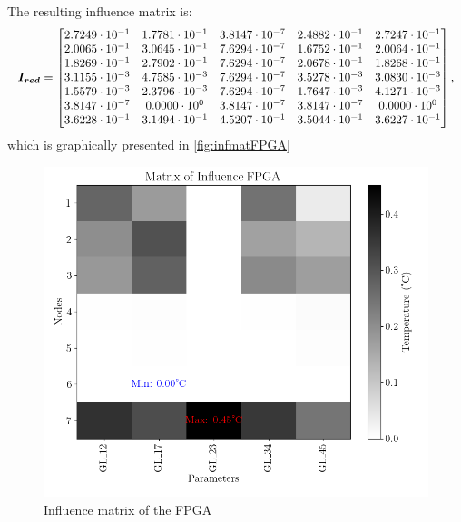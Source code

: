 The resulting influence matrix is:
\begin{equation}
    \resizebox{\textwidth}{!}{$\displaystyle
    \boldsymbol{I_{red}} = \begin{bmatrix}
        2.7249 \cdot 10^{-1} & 1.7781 \cdot 10^{-1} & 3.8147 \cdot 10^{-7} & 2.4882 \cdot 10^{-1} & 2.7247 \cdot 10^{-1} \\
        2.0065 \cdot 10^{-1} & 3.0645 \cdot 10^{-1} & 7.6294 \cdot 10^{-7} & 1.6752 \cdot 10^{-1} & 2.0064 \cdot 10^{-1} \\
        1.8269 \cdot 10^{-1} & 2.7902 \cdot 10^{-1} & 7.6294 \cdot 10^{-7} & 2.0678 \cdot 10^{-1} & 1.8268 \cdot 10^{-1} \\
        3.1155 \cdot 10^{-3} & 4.7585 \cdot 10^{-3} & 7.6294 \cdot 10^{-7} & 3.5278 \cdot 10^{-3} & 3.0830 \cdot 10^{-3} \\
        1.5579 \cdot 10^{-3} & 2.3796 \cdot 10^{-3} & 7.6294 \cdot 10^{-7} & 1.7647 \cdot 10^{-3} & 4.1271 \cdot 10^{-3} \\
        3.8147 \cdot 10^{-7} & 0.0000 \cdot 10^{0} & 3.8147 \cdot 10^{-7} & 3.8147 \cdot 10^{-7} & 0.0000 \cdot 10^{0} \\
        3.6228 \cdot 10^{-1} & 3.1494 \cdot 10^{-1} & 4.5207 \cdot 10^{-1} & 3.5044 \cdot 10^{-1} & 3.6227 \cdot 10^{-1} 
      \end{bmatrix},
        $}
    \label{eq:infmatFPGA}
\end{equation}
 which is graphically presented in \autoref{fig:infmatFPGA}
 
 \begin{figure}[H]
     \centering
     \includegraphics[scale=0.5]{Figures/FPGA/FPGA-redinfmat.png}
     \caption{Influence matrix of the FPGA}
     \label{fig:infmatFPGA}
 \end{figure}

